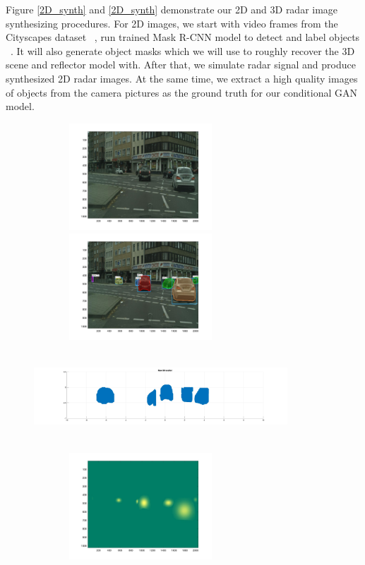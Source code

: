 Figure \ref{2D_synth} and \ref{2D_synth} demonstrate our 2D and 3D radar image synthesizing procedures. For 2D images, we start with video frames from the Cityscapes dataset ~\cite{cityscapes}, run trained Mask R-CNN model to detect and label objects ~\cite{rcnn}. It will also generate object masks which we will use to roughly recover the 3D scene and reflector model with. After that, we simulate radar signal and produce synthesized 2D radar images. At the same time, we extract a high quality images of objects from the camera pictures as the ground truth for our conditional GAN model.   

\begin{figure}
	\centering
	\includegraphics[width=8cm,height=4cm]{./figure/2d_origin.jpg}\\
	\includegraphics[width=8cm,height=4cm]{./figure/2d_detect.jpg}\\
	\includegraphics[width=9.5cm,height=4cm]{./figure/3d_cam.jpg}\\
	\includegraphics[width=8cm,height=4cm]{./figure/2d_blur.jpg}\\

\end{figure}
